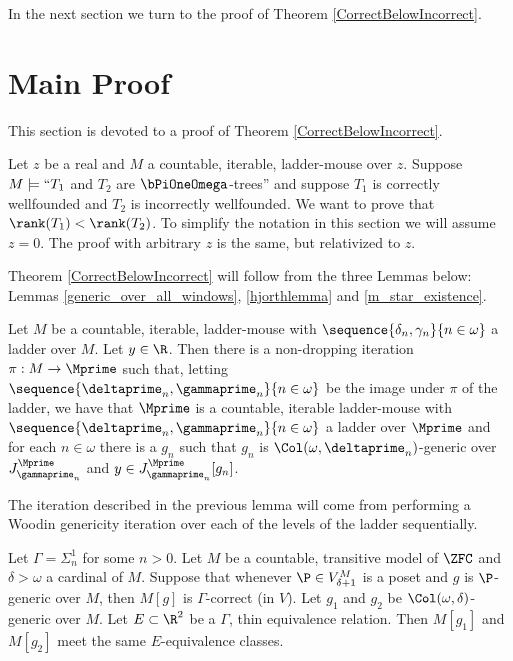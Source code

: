 \documentclass[oneside,12pt]{amsart}
\begin{document}
In the next section we turn to the proof of Theorem \ref{CorrectBelowIncorrect}.


\section{Main Proof}
\label{section:mainproof}

This section is devoted to a proof of Theorem \ref{CorrectBelowIncorrect}.

Let $z$ be a real and $M$ a countable, iterable, ladder-mouse over $z$.
Suppose $M\models ``T_1$ and $T_2$ are $\bPiOneOmega$-trees'' and
suppose $T_1$ is correctly wellfounded and
$T_2$ is incorrectly wellfounded. We want to prove that
$\rank(T_1) < \rank(T_2)$. To simplify the notation in this section we will
assume $z=0$. The proof
with arbitrary $z$ is the same, but relativized to $z$.

Theorem \ref{CorrectBelowIncorrect} will follow from the three Lemmas below:
Lemmas \ref{generic_over_all_windows}, \ref{hjorthlemma} and \ref{m_star_existence}.

\begin{lemma}
\label{generic_over_all_windows}
Let $M$ be a countable, iterable, ladder-mouse
with $\sequence{\delta_n,\gamma_n}{n\in\omega}$ a ladder over $M$.
Let $y\in\R$.
Then there is a non-dropping iteration $\pi:M\to \Mprime$ such that,
letting $\sequence{\deltaprime_n,\gammaprime_n}{n\in\omega}$ be the image under $\pi$
of the ladder, we have that $\Mprime$ is a countable, iterable ladder-mouse
with $\sequence{\deltaprime_n,\gammaprime_n}{n\in\omega}$ a ladder over $\Mprime$
and for each $n\in\omega$ there is a $g_n$ such that $g_n$
is $\Col(\omega,\deltaprime_n)$-generic over
$J^{\Mprime}_{\gammaprime_n}$ and $y\in J^{\Mprime}_{\gammaprime_n}[g_n]$.
\end{lemma}

The iteration described in the previous lemma will come from performing a
Woodin genericity iteration over each of the levels of the ladder sequentially.

\begin{lemma}
\label{hjorthlemma}
Let $\Gamma = \Sigma^1_n$ for some $n>0$.
Let $M$ be a countable, transitive model of $\ZFC$ and  $\delta>\omega$ a cardinal of $M$.
Suppose that whenever $\P\in V^M_{\delta+1}$ is a poset and $g$ is $\P$-generic over $M$, then
$M[g]$ is $\Gamma$-correct (in $V$). Let $g_1$ and $g_2$ be $\Col(\omega, \delta)$-generic over $M$.
Let $E\subset\R^2$ be a $\Gamma$, thin equivalence relation.
Then $M[g_1]$ and $M[g_2]$ meet the same $E$-equivalence classes.
\end{lemma}
\end{document}
